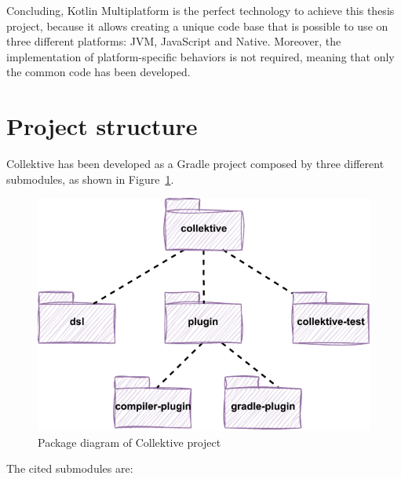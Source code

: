Concluding, Kotlin Multiplatform is the perfect technology to achieve this thesis project, because it allows creating a unique code base that is possible to use on three different platforms: JVM, JavaScript and Native. Moreover, the implementation of platform-specific behaviors is not required, meaning that only the common code has been developed.

\section{Project structure}\label{section:project_structure}
Collektive has been developed as a Gradle project composed by three different submodules, as shown in Figure~\ref{fig:collektive_package_diagram}.
\begin{figure}[!ht]
    \centering
    \includegraphics[scale=1.1]{document/chapters/4-collektive/images/collektive_package_diagram.pdf}
    \caption{Package diagram of Collektive project}
    \label{fig:collektive_package_diagram}
\end{figure}
The cited submodules are:
